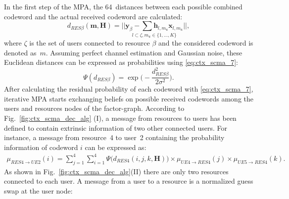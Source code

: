 In the first step of the MPA, the 64~distances between each possible
combined codeword and the actual received codeword are calculated:
\begin{equation}
  \label{eq:ctx_scma_5}
  d_{RES  \beta}(\bm{m}, \bm{H}) =
  \underset{l \subset \zeta, m_u\in\{1,...,K\}}{||\bm{y}_\beta -
  \sum \bm{h}_{l,m_u} \bm{x}_{l,m_u} ||},
\end{equation}
where $\zeta$ is the set of users connected to resource $\beta$ and the
considered codeword is denoted as~$m$.
Assuming perfect channel estimation and Gaussian noise, these Euclidean
distances can be expressed as probabilities using
\eqref{eq:ctx_scma_7}:
\begin{equation}
  \label{eq:ctx_scma_7}
  \Psi(d_{RES \beta}) = \exp \Bigg(-\frac{d_{RES \beta}^2}{2\sigma^2} \Bigg).
\end{equation}
After calculating the residual probability of each codeword with
\eqref{eq:ctx_scma_7}, iterative MPA starts exchanging beliefs on possible
received codewords among the users and resources nodes of the factor-graph.
According to Fig.~\ref{fig:ctx_scma_dec_alg} (I), a message from resources to
users has been defined to contain extrinsic information of two other connected
users. For instance, a message from resource~4 to user~2 containing the
probability information of codeword $i$ can be expressed as:
\begin{equation}
  \label{eq:ctx_scma_8}
  \begin{split}
  \mu_{RES4 \rightarrow UE2}(i) = \sum\limits_{j=1}^4 \sum\limits_{i=1}^4 \Psi
  \Big(d_{RES4}(i,j,k,\bm{H}) \Big)
  \times \mu_{UE4 \rightarrow RES4}(j) \times \mu_{UE5 \rightarrow RES4}(k).
  \end{split}
\end{equation}
As shown in Fig.~\ref{fig:ctx_scma_dec_alg}(II) there are only two resources
connected to each user. A message from a user to a resource is a normalized
guess swap at the user node:
